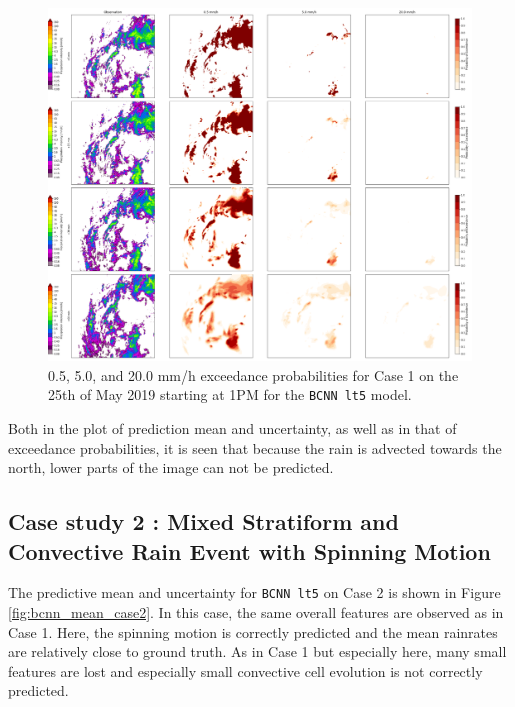 \begin{figure}[H]
	\centering
	\includegraphics[width=\textwidth]{images/cases/bcnn_prob_case1}
	\caption{0.5, 5.0, and 20.0 mm/h exceedance probabilities for Case 1 on the 25th of May 2019 starting at 1PM for the \texttt{BCNN lt5} model.}
	\label{fig:bcnn_prob_case1}
\end{figure}

Both in the plot of prediction mean and uncertainty, as well as in that of exceedance probabilities, it is seen that because the rain is advected towards the north, lower parts of the image can not be predicted. 

\subsection{Case study 2 : Mixed Stratiform and Convective Rain Event with Spinning Motion}

The predictive mean and uncertainty for \texttt{BCNN lt5} on Case 2 is shown in Figure \ref{fig:bcnn_mean_case2}. In this case, the same overall features are observed as in Case 1. Here, the spinning motion is correctly predicted and the mean rainrates are relatively close to ground truth. As in Case 1 but especially here, many small features are lost and especially small convective cell evolution is not correctly predicted. 

